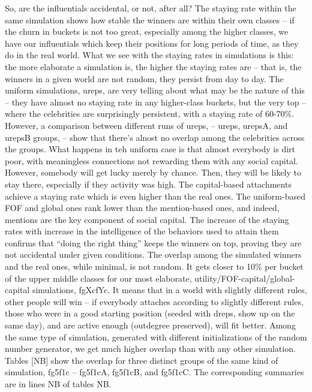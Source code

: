 \documentclass[10pt,oneside]{memoir}
\begin{document}
So, are the influentials accidental, or not, after all?
The staying rate within the same simulation shows how stable the winners are within their own classes -- if the churn in buckets is not too great, especially among the higher classes, we have our influentials which keep their positions for long periods of time, as they do in the real world.
What we see with the staying rates in simulations is this: the more elaborate a simulation is, the higher the staying rates are -- that is, the winners in a given world are not random, they persist from day to day.  The uniform simulations, ureps, are very telling about what may be the nature of this -- they have almost no staying rate in any higher-class buckets, but the very top -- where the celebrities are surprisingly persistent, with a staying rate of 60-70\%.  However, a comparison between different runs of ureps, -- ureps, urepsA, and urepsB groups, -- show that there's alnost no overlap among the celebrities across the groups.  What happens in teh uniform case is that almost everybody is dirt poor, with meaningless connections not rewarding them with any social capital.  However, somebody will get lucky merely by chance.  Then, they will be likely to stay there, especially if they activity was high. 
The capital-based attachments achieve a staying rate which is even higher than the real ones.  The uniform-based FOF and global ones rank lower than the mention-based ones, and indeed, mentions are the key component of social capital.  The increase of the staying rates with increase in the intelligence of the behaviors used to attain them confirms that ``doing the right thing'' keeps the winners on top, proving they are not accidental under given conditions.
The overlap among the simulated winners and the real ones, while minimal, is not random.  It gets closer to 10\% per bucket of the upper middle classes for our most elaborate, utility/FOF-capital/global-capital simulations, fgXcfYc.  It means that in a world with slightly different rules, other people will win -- if everybody attaches according to slightly different rules, those who were in a good starting position (seeded with dreps, show up on the same day), and are active enough (outdegree preserved), will fit better.
Among the same type of simulation, generated with different initializations of the random number generator, we get much higher overlap than with any other simulation.  Tables [NB] show the overlap for three distinct groups of the same kind of simulation, fg5f1c -- fg5f1cA, fg5f1cB, and fg5f1cC.  The corresponding summaries are in lines NB of tables NB.
\end{document}
